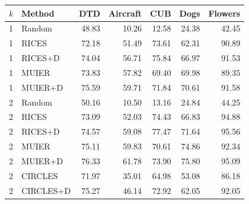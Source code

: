 \begin{tabular}{llrrrrr}
\toprule
$k$ & Method & DTD & Aircraft & CUB & Dogs & Flowers \\
\midrule
1 & Random & 48.83 & 10.26 & 12.58 & 24.38 & 42.45 \\
1 & RICES & 72.18 & 51.49 & 73.61 & 62.31 & 90.89 \\
1 & RICES+D & 74.04 & 56.71 & 75.84 & 66.97 & 91.53 \\
1 & MUIER & 73.83 & 57.82 & 69.40 & 69.98 & 89.35 \\
1 & MUIER+D & 75.59 & 59.71 & 71.84 & 70.61 & 91.58 \\
2 & Random & 50.16 & 10.50 & 13.16 & 24.84 & 44.25 \\
2 & RICES & 73.09 & 52.03 & 74.43 & 66.83 & 94.88 \\
2 & RICES+D & 74.57 & 59.08 & 77.47 & 71.64 & 95.56 \\
2 & MUIER & 75.11 & 59.83 & 70.61 & 74.86 & 92.34 \\
2 & MUIER+D & 76.33 & 61.78 & 73.90 & 75.80 & 95.09 \\
2 & CIRCLES & 71.97 & 35.01 & 64.98 & 53.08 & 86.18 \\
2 & CIRCLES+D & 75.27 & 46.14 & 72.92 & 62.05 & 92.05 \\
\bottomrule
\end{tabular}
